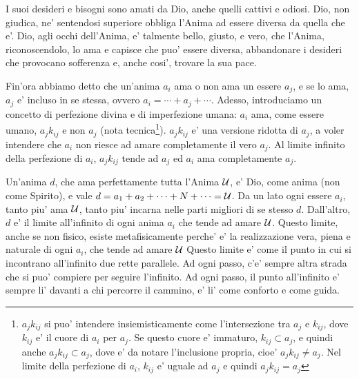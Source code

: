 I suoi desideri e bisogni sono amati da Dio, anche quelli cattivi e odiosi. Dio, non giudica, ne' sentendosi superiore obbliga l'Anima ad essere diversa da quella che e'. Dio, agli occhi dell'Anima, e' talmente bello, giusto, e vero, che l'Anima, riconoscendolo, lo ama e capisce che puo' essere diversa, abbandonare i desideri che provocano sofferenza e, anche cosi', trovare la sua pace.

Fin'ora abbiamo detto che un'anima $a_i$ ama o non ama un essere $a_j$, e se lo ama, $a_j$ e' incluso in se stessa, ovvero $a_i=\cdots+a_j+\cdots$. Adesso, introduciamo un concetto di perfezione divina e di imperfezione umana: $a_i$ ama, come essere umano, $a_jk_{ij}$ e non $a_j$ (nota tecnica\footnote{$a_jk_{ij}$ si puo' intendere insiemisticamente come l'intersezione tra $a_j$ e $k_{ij}$, dove $k_{ij}$ e' il cuore di $a_i$ per $a_j$. Se questo cuore e' immaturo, $k_{ij} \subset a_j$, e quindi anche $a_jk_{ij}\subset a_j$, dove e' da notare l'inclusione propria, cioe' $a_jk_{ij}\ne a_j$. Nel limite della perfezione di $a_i$, $k_{ij}$ e' uguale ad $a_j$ e quindi $a_jk_{ij}=a_j$}). $a_jk_{ij}$ e' una versione ridotta di $a_j$, a voler intendere che $a_i$ non riesce ad amare completamente il vero $a_j$. Al limite infinito della perfezione di $a_i$, $a_jk_{ij}$ tende ad $a_j$ ed $a_i$ ama completamente $a_j$.

Un'anima $d$, che ama perfettamente tutta l'Anima $\mathcal{U}$, e' Dio, come anima (non come Spirito), e vale $d=a_1+a_2+\cdots+N+\cdots=\mathcal{U}$. Da un lato ogni essere $a_i$, tanto piu' ama $\mathcal{U}$, tanto piu' incarna nelle parti migliori di se stesso $d$. Dall'altro, $d$ e' il limite all'infinito di ogni anima $a_i$ che tende ad amare $\mathcal{U}$. Questo limite, anche se non fisico, esiste metafisicamente perche' e' la realizzazione vera, piena e naturale di ogni $a_i$, che tende ad amare $\mathcal{U}$
Questo limite e' come il punto in cui si incontrano all'infinito due rette parallele. Ad ogni passo, c'e' sempre altra strada che si puo' compiere per seguire l'infinito. Ad ogni passo, il punto all'infinito e' sempre li' davanti a chi percorre il cammino, e' li' come conforto e come guida.

